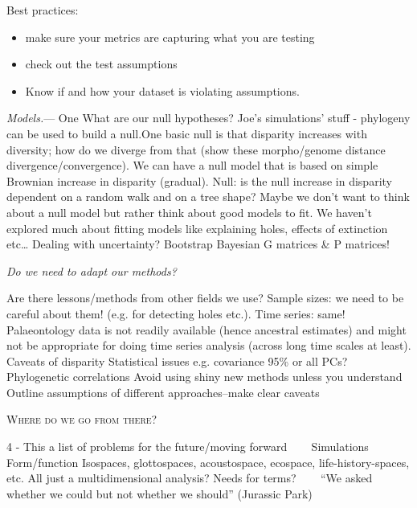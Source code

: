 \documentclass[12pt,letterpaper]{article}
\renewcommand{\section}[1]{%
\bigskip
\begin{center}
\begin{Large}
\normalfont\scshape #1
\medskip
\end{Large}
\end{center}}
\renewcommand{\subsection}[1]{%
\bigskip
\begin{center}
\begin{large}
\normalfont\itshape #1
\end{large}
\end{center}}
\renewcommand{\subsubsection}[1]{%
\vspace{2ex}
\noindent
\textit{#1.}---}
\begin{document}
Best practices:
\begin{itemize}
\item make sure your metrics are capturing what you are testing
\item check out the test assumptions
\item Know if and how your dataset is violating assumptions.
\end{itemize}

\subsubsection{Models}
One 
What are our null hypotheses?
Joe’s simulations’ stuff - phylogeny can be used to build a null.One basic null is that disparity increases with diversity; how do we diverge from that (show these morpho/genome distance divergence/convergence).
We can have a null model that is based on simple Brownian increase in disparity (gradual). 
Null: is the null increase in disparity dependent on a random walk and on a tree shape?
Maybe we don’t want to think about a null model but rather think about good models to fit. 
We haven’t explored much about fitting models like explaining holes, effects of extinction etc…
Dealing with uncertainty? Bootstrap Bayesian G matrices \& P matrices!


\subsection{Do we need to adapt our methods?}
Are there lessons/methods from other fields we use?
Sample sizes: we need to be careful about them! (e.g. for detecting holes etc.).
Time series: same! Palaeontology data is not readily available (hence ancestral estimates) and might not be appropriate for doing time series analysis (across long time scales at least).
Caveats of disparity
Statistical issues e.g. covariance
95\% or all PCs?
Phylogenetic correlations
Avoid using shiny new methods unless you understand
Outline assumptions of different approaches--make clear caveats



\section{Where do we go from there?}
4 - This a list of problems for the future/moving forward
    Simulations 
    Form/function
Isospaces, glottospaces, acoustospace, ecospace, life-history-spaces, etc. All just a multidimensional analysis? Needs for terms?
    
``We asked whether we could but not whether we should'' (Jurassic Park)
\end{document}
